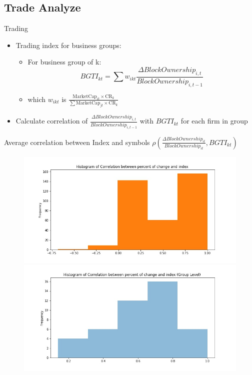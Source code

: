 \documentclass{beamer}
\begin{document}
	\subsection{Trade Analyze}
	\begin{frame}{Trading}{\cite{greenwood2011stock}}
		\begin{itemize}
			\item Trading index for business groups:
			\begin{itemize}
				\item For business group of k: 	\[ BGTI_{kt} = \sum w_{ikt} \frac{\Delta BlockOwnership_{i,t}}{BlockOwnership_{i,t-1}} \]
				\item   which $  w_{ikt} $ is  $ \frac{\text{MarketCap}_{it} \times \text{CR}_k}
				{\sum \text{MarketCap}_{jt} \times \text{CR}_k } $		
			\end{itemize}
			\item Calculate correlation of $ \frac{\Delta BlockOwnership_{i,t}}{BlockOwnership_{i,t-1}} $ with $ BGTI_{kt} $ for each firm in group
			
		\end{itemize}
		
	\end{frame}


	
	\begin{frame}{Average correlation between Index and symbols}{
			$ \rho(\frac{\Delta BlockOwnership_{it}}{BlockOwnership_{it}},
			BGTI_{kt}	) $}
		
		
		\begin{figure}
			\centering
			\includegraphics[width=0.55\linewidth]{../Trade/CorrIndexSymbol}
			\includegraphics[width=0.55\linewidth]{../Trade/CorrIndex}
			\label{fig:corrindex}
		\end{figure}
	\end{frame}
	
\end{document}
